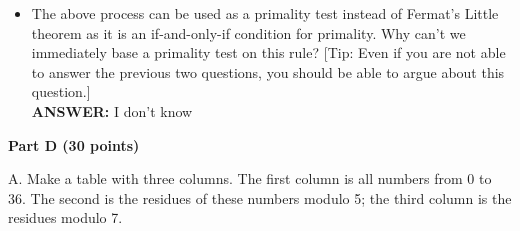 \documentclass{article}
\begin{document}
\begin{itemize}
\item The above process can be used as a primality test instead of
  Fermat's Little theorem as it is an if-and-only-if condition for
  primality. Why can't we immediately base a primality test on this
  rule? [Tip: Even if you are not able to answer the previous two
    questions, you should be able to argue about this question.]\\

{\bfseries ANSWER: }I don't know\\

\end{itemize}

\begin{center}
{\bf Part D (30 points)}
\end{center}



\noindent A. Make a table with three columns. The first column is all numbers
from 0 to 36. The second is the residues of these numbers modulo 5;
the third column is the residues modulo 7.\\
\end{document}
